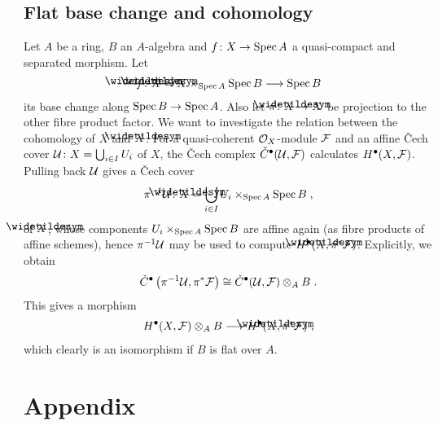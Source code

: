 \documentclass[a4paper,parskip=half,numbers=enddot, DIV=12]{scrreprt}
\begin{document}
\section{Flat base change and cohomology}
Let $A$ be a ring, $B$ an $A$-algebra and $f\colon X\morphism \Spec A$ a quasi-compact and separated morphism. Let 
\begin{align*}
	\snake{f}\colon\snake{X}=X\times_{\Spec A}\Spec B\morphism\Spec B%
\end{align*}
its base change along $\Spec B\morphism\Spec A$. Also let $\pi\colon \snake{X}\morphism X$ be projection to the other fibre product factor. We want to investigate the relation between the cohomology of $X$ and $\snake{X}$. For a quasi-coherent $\mathcal{O}_X$-module $\mathcal{F}$ and an affine \v Cech cover $\mathcal{U}\colon X=\bigcup_{i\in I}U_i$ of $X$, the \v Cech complex $\check{C}^\bullet(\mathcal{U},\mathcal{F})$ calculates $H^\bullet(X,\mathcal{F})$. Pulling back $\mathcal{U}$ gives a \v Cech cover
\begin{align*}
	\pi^{-1}\Uu\colon \snake{X}=\bigcup_{i\in I}U_i\times_{\Spec A}\Spec B\;,
\end{align*}
of $\snake{X}$, whose components $U_i\times_{\operatorname{Spec} A}\operatorname{Spec} B$ are affine again (as fibre products of affine schemes), hence $\pi^{-1}\mathcal{U}$ may be used to compute $H^\bullet(\snake{X},\pi^*\Ff)$. Explicitly, we obtain
\begin{align}\lbl{eq:tensoredCechComplex}
	\check{C}^\bullet\left(\pi^{-1}\Uu,\pi^*\Ff\right)\cong \check{C}^\bullet(\Uu,\Ff)\otimes_AB\;.
\end{align}
This gives a morphism
\begin{align}\lbl{eq:tensoredCohomology}
	H^\bullet(X,\Ff)\otimes_AB\morphism H^\bullet(\snake{X},\pi^*\Ff)\;,
\end{align}
which clearly is an isomorphism if $B$ is flat over $A$.

\Appendix
\chapter{Appendix}
\end{document}
